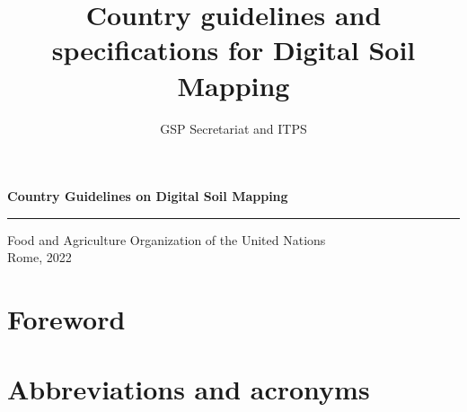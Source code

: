 \documentclass[
  10pt,
  b5paper,
  oneside]{book}
\title{Country guidelines and specifications for Digital Soil Mapping}
\author{GSP Secretariat and ITPS}
\date{}
\newcommand\blankpage{%
    \null
    \thispagestyle{empty}%
    \addtocounter{page}{-1}%
    \newpage}
\theoremstyle{definition}
\theoremstyle{definition}
\theoremstyle{definition}
\theoremstyle{definition}
\theoremstyle{remark}
\begin{document}
\maketitle

\pagestyle{plain}

\afterpage{\blankpage}
\thispagestyle{empty}
\begin{titlepage}
    \begin{center}
        \vspace*{4cm}
        \Large

        \textcolor{astral}{\textbf{Country Guidelines on Digital Soil Mapping\\}}
        \vspace{0.5cm}
        \normalsize
        \vfill
        \noindent
        {\color{astral}\rule{\linewidth}{0.5mm} }

        Food and Agriculture Organization of the United Nations\\
	Rome, 2022
    \end{center}
\end{titlepage}



\frontmatter
{}   
\tableofcontents
\listoffigures
\listoftables
\nopagebreak[4]

\hypertarget{foreword}{%
\chapter*{Foreword}\label{foreword}}

\hypertarget{abbreviations-and-acronyms}{%
\chapter*{Abbreviations and acronyms}\label{abbreviations-and-acronyms}}
\end{document}
